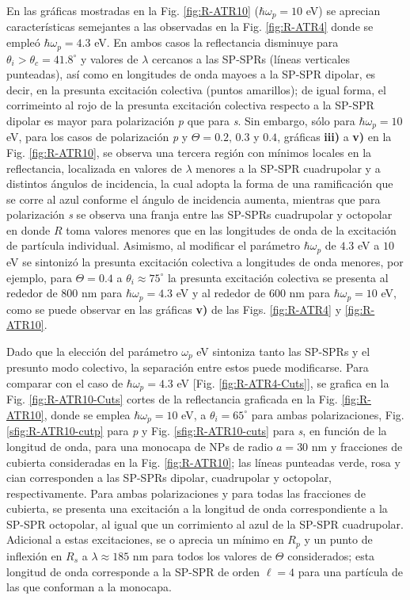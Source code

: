 En las gráficas mostradas en la Fig. \ref{fig:R-ATR10} ($\hbar\omega_p = 10$ eV) se aprecian características semejantes a las observadas en la Fig. \ref{fig:R-ATR4} donde se empleó $\hbar\omega_p = 4.3$ eV. En ambos casos la reflectancia disminuye para $\theta_i>\theta_c=41.8^\circ$ y valores de $\lambda$ cercanos a las SP-SPRs (líneas verticales punteadas), así como en longitudes de onda mayoes a la SP-SPR dipolar, es decir, en la presunta excitación colectiva  (puntos amarillos); de igual forma, el corrimeinto al rojo de la presunta excitación colectiva respecto a la SP-SPR dipolar es mayor para polarización \emph{p} que para \emph{s}. Sin embargo, sólo para $\hbar\omega_p = 10$ eV, para los casos de polarización \emph{p} y $\Theta = 0.2,\,0.3$ y $0.4$, gráficas \textbf{iii)} a \textbf{v)} en la Fig. \ref{fig:R-ATR10}, se observa una tercera región con mínimos locales en la reflectancia, localizada en valores de $\lambda$ menores a la SP-SPR cuadrupolar y a distintos ángulos de incidencia, la cual adopta la forma de una ramificación que se corre al azul conforme el ángulo de incidencia aumenta, mientras que para polarización \emph{s} se observa una franja entre las SP-SPRs cuadrupolar y octopolar en donde $R$ toma valores menores que en las longitudes de onda de la excitación de partícula individual. Asimismo, al modificar el parámetro $\hbar\omega_p$ de $4.3$ eV a $10$ eV se sintonizó la presunta excitación colectiva a longitudes de onda menores, por ejemplo, para $\Theta = 0.4$ a $\theta_i\approx 75^\circ$ la presunta excitación colectiva se presenta al rededor de $800$ nm para $\hbar\omega_p=4.3$ eV y al rededor de $600$ nm para $\hbar\omega_p=10$ eV, como se puede observar en las gráficas \textbf{v)} de las Figs. \ref{fig:R-ATR4} y \ref{fig:R-ATR10}.

Dado que la elección del parámetro $\omega_p$ eV sintoniza tanto las SP-SPRs y el presunto modo colectivo, la separación entre estos puede modificarse. Para comparar con el caso de $\hbar\omega_p=4.3$ eV [Fig. \ref{fig:R-ATR4-Cuts}], se grafica en la Fig. \ref{fig:R-ATR10-Cuts} cortes de la reflectancia graficada en la Fig. \ref{fig:R-ATR10}, donde se emplea $\hbar\omega_p = 10$ eV, a $\theta_i = 65^\circ$ para ambas polarizaciones,  Fig. \ref{sfig:R-ATR10-cutp} para \emph{p} y Fig. \ref{sfig:R-ATR10-cuts} para \emph{s}, en  función de la longitud de onda, para una monocapa de NPs de radio $a= 30$ nm  y fracciones de cubierta consideradas en la Fig. \ref{fig:R-ATR10}; las líneas punteadas verde, rosa y cian corresponden a las SP-SPRs dipolar, cuadrupolar y octopolar, respectivamente. Para ambas polarizaciones y para todas las fracciones de cubierta, se presenta una excitación a la longitud de onda correspondiente a la SP-SPR octopolar, al igual que un corrimiento al azul de la SP-SPR cuadrupolar. Adicional a estas excitaciones, se o aprecia un mínimo en $R_p$ y un punto de inflexión en $R_s$ a $\lambda\approx 185$ nm para todos los valores de $\Theta$ considerados; esta longitud de onda corresponde a la SP-SPR de orden $\ell = 4$ para una partícula de las que conforman a la monocapa.

